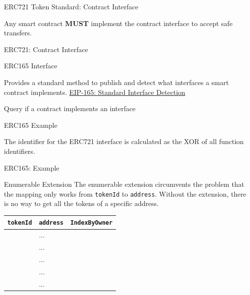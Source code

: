 \documentclass[handout]{beamer}
\begin{document}
\begin{frame}{ERC721 Token Standard: Contract Interface}

Any smart contract \textbf{MUST} implement the contract interface to accept safe transfers.
\vspace{1em}
	\begin{samplecode}{ERC721: Contract Interface}
		
	\end{samplecode}
\end{frame}

\begin{frame}{ERC165 Interface}

Provides a standard method to publish and detect what interfaces a smart contract implements. \link \href{https://eips.ethereum.org/EIPS/eip-165}{EIP-165: Standard Interface Detection}
\vspace{1em}
	\begin{samplecode}{Query if a contract implements an interface}
			
	\end{samplecode}
\end{frame}


\begin{frame}{ERC165 Example}

The identifier for the ERC721 interface is calculated as the XOR of all function identifiers.
\vspace{0.5em}
\begin{samplecode}{ERC165: Example}
		
\end{samplecode}
\end{frame}

\begin{frame}{Enumerable Extension}
The enumerable extension circumvents the problem that the mapping only works from \texttt{tokenId} to \texttt{address}. Without the extension, there is no way to get all the tokens of a specific address.
\vspace{0.5em}
		\begin{table}
			\begin{tabular}{clc}
			\hline \hline
			\texttt{tokenId} & \texttt{address} & \texttt{IndexByOwner}\\
			\hline
			\color{focus}{0} & \color{focus}{0x0901}... & \color{focus}{0} \\
			\color{mint}{1} & \color{mint}{0x7A25}... & \color{mint}{0} \\
			\color{focus}{2} & \color{focus}{0x0901}... & \color{focus}{1}\\
			\color{focus}{3} & \color{focus}{0x0901}... & \color{focus}{2}\\
			\color{darkmint}{4} & \color{darkmint}{0xce9b}... & \color{darkmint}{0} \\
			\hline \hline
			\end{tabular}
		\end{table}
\end{frame}
\end{document}
